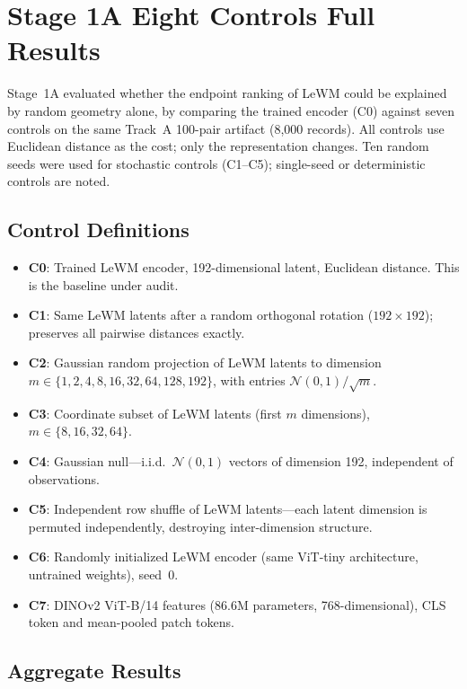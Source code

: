 \section{Stage 1A Eight Controls Full Results}
\label{app:stage1a}

Stage~1A evaluated whether the endpoint ranking of LeWM could be explained by
random geometry alone, by comparing the trained encoder (C0) against seven
controls on the same Track~A 100-pair artifact (8{,}000 records).  All
controls use Euclidean distance as the cost; only the representation
changes.  Ten random seeds were used for stochastic controls (C1--C5);
single-seed or deterministic controls are noted.

\subsection{Control Definitions}
\label{app:control_defs}

\begin{itemize}
\item \textbf{C0}: Trained LeWM encoder, 192-dimensional latent, Euclidean
  distance.  This is the baseline under audit.
\item \textbf{C1}: Same LeWM latents after a random orthogonal rotation
  ($192\times 192$); preserves all pairwise distances exactly.
\item \textbf{C2}: Gaussian random projection of LeWM latents to dimension
  $m \in \{1,2,4,8,16,32,64,128,192\}$, with entries
  $\mathcal{N}(0,1)/\!\sqrt{m}$.
\item \textbf{C3}: Coordinate subset of LeWM latents (first $m$ dimensions),
  $m \in \{8,16,32,64\}$.
\item \textbf{C4}: Gaussian null---i.i.d.\ $\mathcal{N}(0,1)$ vectors of
  dimension 192, independent of observations.
\item \textbf{C5}: Independent row shuffle of LeWM latents---each latent
  dimension is permuted independently, destroying inter-dimension structure.
\item \textbf{C6}: Randomly initialized LeWM encoder (same ViT-tiny architecture,
  untrained weights), seed~0.
\item \textbf{C7}: DINOv2 ViT-B/14 features (86.6M parameters,
  768-dimensional), CLS token and mean-pooled patch tokens.
\end{itemize}

\subsection{Aggregate Results}
\label{app:stage1a_agg}

